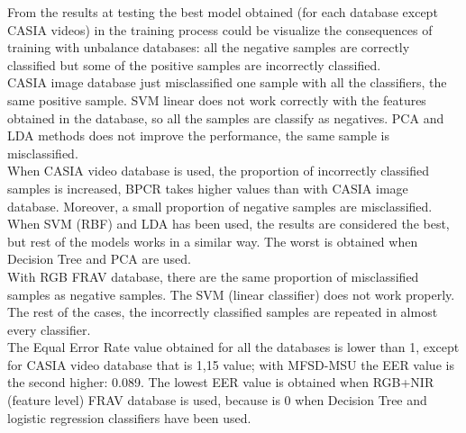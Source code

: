 From the results at testing the best model obtained (for each database except CASIA videos) in the training process could be visualize the consequences of training with unbalance databases: all the negative samples are correctly classified but some of the positive samples are incorrectly classified.\\

CASIA image database just misclassified one sample with all the classifiers, the same positive sample. SVM linear does not work correctly with the features obtained in the database, so all the samples are classify as negatives. PCA and LDA methods does not improve the performance, the same sample is misclassified.\\

When CASIA video database is used, the proportion of incorrectly classified samples is increased, BPCR takes higher values than with CASIA image database. Moreover, a small proportion of negative samples are misclassified. When SVM (RBF) and LDA has been used, the results are considered the best, but rest of the models works in a similar way. The worst is obtained when Decision Tree and PCA are used.\\

With RGB FRAV database, there are the same proportion of misclassified samples as negative samples. The SVM (linear classifier) does not work properly. The rest of the cases, the incorrectly classified samples are repeated in almost every classifier.\\


The Equal Error Rate value obtained for all the databases is lower than 1, except for CASIA video database that is 1,15 value; with MFSD-MSU the EER value is the second higher: 0.089. The lowest EER value is obtained when RGB+NIR (feature level) FRAV database is used, because is 0 when Decision Tree and logistic regression classifiers have been used.\\


 





